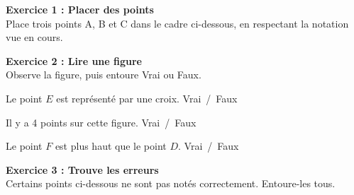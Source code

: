 \documentclass[11pt]{article}
\begin{document}
\textbf{Exercice 1 : Placer des points} \\
Place trois points A, B et C dans le cadre ci-dessous, en respectant
la notation vue en cours.

\begin{center}
\end{center}

\vspace{0.5cm}
\textbf{Exercice 2 : Lire une figure} \\
Observe la figure, puis entoure Vrai ou Faux.

\begin{center}
\end{center}

\begin{enu}
\item Le point $E$ est représenté par une croix. \hfill Vrai\ /\ Faux
\item Il y a 4 points sur cette figure. \hfill Vrai\ /\ Faux
\item Le point $F$ est plus haut que le point $D$. \hfill Vrai\ /\ Faux
\end{enu}

\vspace{0.5cm}
\textbf{Exercice 3 : Trouve les erreurs} \\
Certains points ci-dessous ne sont pas notés correctement. Entoure-les tous.

\begin{center}
\end{center}
\end{document}
